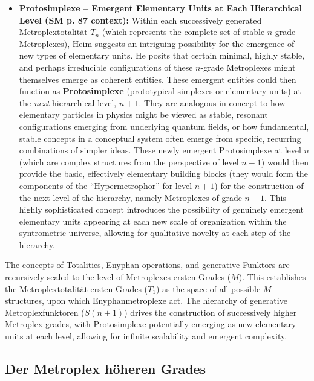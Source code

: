 \documentclass[12pt]{article}
\newcommand{\q}[1]{\enquote{#1}}
\def\metroplex#1#2{M}%
\newcommand{\hypersyntrix}{\metroplex{1}{F}}
\newcommand{\metroplextotalitaet}[1]{T_{#1}}
\newcommand{\metroplexfunktor}{S}
\begin{document}
\begin{itemize}
    \item \textbf{Protosimplexe – Emergent Elementary Units at Each Hierarchical Level (SM p. 87 context):}
    Within each successively generated Metroplextotalität \( \metroplextotalitaet{n} \) (which represents the complete set of stable \( n \)-grade Metroplexes), Heim suggests an intriguing possibility for the emergence of new types of elementary units. He posits that certain minimal, highly stable, and perhaps irreducible configurations of these \( n \)-grade Metroplexes might themselves emerge as coherent entities. These emergent entities could then function as \textbf{Protosimplexe} (prototypical simplexes or elementary units) at the \textit{next} hierarchical level, \( n+1 \). They are analogous in concept to how elementary particles in physics might be viewed as stable, resonant configurations emerging from underlying quantum fields, or how fundamental, stable concepts in a conceptual system often emerge from specific, recurring combinations of simpler ideas. These newly emergent Protosimplexe at level \( n \) (which are complex structures from the perspective of level \(n-1\)) would then provide the basic, effectively elementary building blocks (they would form the components of the \q{Hypermetrophor} for level \(n+1\)) for the construction of the next level of the hierarchy, namely Metroplexes of grade \( n+1 \). This highly sophisticated concept introduces the possibility of genuinely emergent elementary units appearing at each new scale of organization within the syntrometric universe, allowing for qualitative novelty at each step of the hierarchy.
\end{itemize}

The concepts of Totalities, Enyphan-operations, and generative Funktors are recursively scaled to the level of Metroplexes ersten Grades (\(\hypersyntrix\)). This establishes the Metroplextotalität ersten Grades (\(\metroplextotalitaet{1}\)) as the space of all possible \(\hypersyntrix\) structures, upon which Enyphanmetroplexe act. The hierarchy of generative Metroplexfunktoren (\(\metroplexfunktor(n+1)\)) drives the construction of successively higher Metroplex grades, with Protosimplexe potentially emerging as new elementary units at each level, allowing for infinite scalability and emergent complexity.

\subsection{Der Metroplex höheren Grades}
\label{sec:higher_metroplex}
\end{document}
